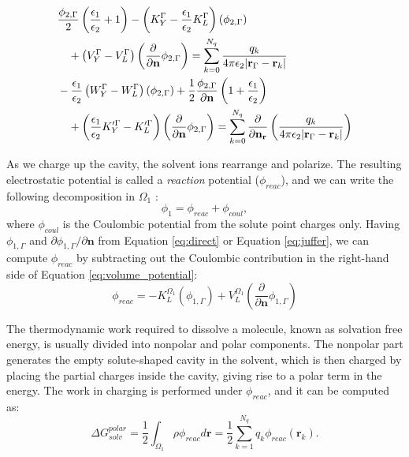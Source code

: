 \begin{align}\label{eq:lu}
    &\begin{multlined}[t][0.48\textwidth] \frac{\phi_{2,\Gamma}}{2}\left(\frac{\epsilon_1}{\epsilon_2}+1\right) - \left(K_Y^\Gamma - \frac{\epsilon_1}{\epsilon_2}K_L^\Gamma\right)(\phi_{2,\Gamma}) \\
    + \left(V_Y^\Gamma - V_L^\Gamma\right)\left( \frac{\partial}{\partial \mathbf{n}} \phi_{2,\Gamma} \right) = \sum_{k=0}^{N_q}  \frac{q_k}{4\pi\epsilon_2|\mathbf{r}_{\Gamma} - \mathbf{r}_k|}
    \end{multlined} \nonumber \\
    &\begin{multlined}[t][0.48\textwidth] -\frac{\epsilon_1}{\epsilon_2}\left(W_Y^\Gamma - W_L^\Gamma\right)(\phi_{2,\Gamma}) +  \frac{1}{2}\frac{\phi_{2,\Gamma}}{\partial\mathbf{n}}\left(1+\frac{\epsilon_1}{\epsilon_2}\right) \\
    + \left(\frac{\epsilon_1}{\epsilon_2}K_Y^{\prime\Gamma} - K_L^{\prime\Gamma}\right)\left( \frac{\partial}{\partial \mathbf{n}} \phi_{2,\Gamma} \right) = \sum_{k=0}^{N_q}  \frac{\partial}{\partial\mathbf{n}_\mathbf{r}}\left(\frac{q_k}{4\pi\epsilon_2|\mathbf{r}_{\Gamma} - \mathbf{r}_k|}\right)
    \end{multlined}
\end{align}

As we charge up the cavity, the solvent ions rearrange and polarize.
The resulting electrostatic potential is called a \emph{reaction} potential ($\phi_{reac}$), and we can write the following decomposition in $\Omega_1$ :
%
\begin{equation}
\phi_1 = \phi_{reac} + \phi_{coul},
\end{equation}
%
where $\phi_{coul}$ is the Coulombic potential from the solute point charges only.
Having $\phi_{1,\Gamma}$ and $\partial\phi_{1,\Gamma}/\partial\mathbf{n}$ from Equation \eqref{eq:direct} or Equation \eqref{eq:juffer}, we can compute $\phi_{reac}$ by subtracting out the Coulombic contribution in the right-hand side of Equation \eqref{eq:volume_potential}:
%
\begin{equation}\label{eq:phi_reac}
\phi_{reac} = -K_{L}^{\Omega_1}(\phi_{1,\Gamma}) +  V_{L}^{\Omega_1} \left(\frac{\partial}{\partial \mathbf{n}}  \phi_{1,\Gamma}  \right) 
\end{equation}

The thermodynamic work required to dissolve a molecule, known as solvation free energy, is usually divided into nonpolar and polar components.
The nonpolar part generates the empty solute-shaped cavity in the solvent, which is then charged by placing the partial charges inside the cavity, giving rise to a polar term in the energy. 
The work in charging is performed under $\phi_{reac}$, and it can be computed as:
%
\begin{equation} \label{eq:energy}
\Delta G^{polar}_{solv} = \frac{1}{2}\int_{\Omega_1} \rho\phi_{reac}d\mathbf{r} = \frac{1}{2}\sum_{k=1}^{N_q}q_k\phi_{reac}(\mathbf{r}_k).
\end{equation}
